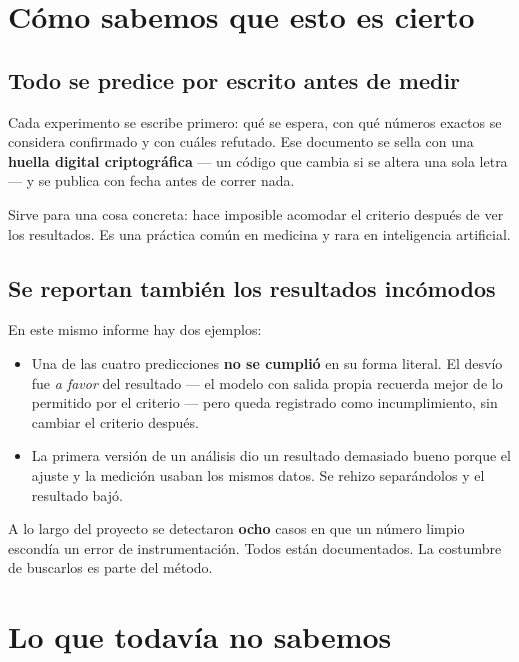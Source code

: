 \documentclass[11pt,a4paper]{article}
\begin{document}
\section{Cómo sabemos que esto es cierto}

\subsection{Todo se predice por escrito antes de medir}

Cada experimento se escribe primero: qué se espera, con qué números exactos se considera
confirmado y con cuáles refutado. Ese documento se sella con una \textbf{huella digital
criptográfica} --- un código que cambia si se altera una sola letra --- y se publica con fecha
antes de correr nada.

Sirve para una cosa concreta: hace imposible acomodar el criterio después de ver los resultados.
Es una práctica común en medicina y rara en inteligencia artificial.

\subsection{Se reportan también los resultados incómodos}

En este mismo informe hay dos ejemplos:

\begin{itemize}
  \item Una de las cuatro predicciones \textbf{no se cumplió} en su forma literal. El desvío fue
  \emph{a favor} del resultado --- el modelo con salida propia recuerda mejor de lo permitido por
  el criterio --- pero queda registrado como incumplimiento, sin cambiar el criterio después.
  \item La primera versión de un análisis dio un resultado demasiado bueno porque el ajuste y la
  medición usaban los mismos datos. Se rehizo separándolos y el resultado bajó.
\end{itemize}

A lo largo del proyecto se detectaron \textbf{ocho} casos en que un número limpio escondía un
error de instrumentación. Todos están documentados. La costumbre de buscarlos es parte del
método.

\section{Lo que todavía no sabemos}
\end{document}
